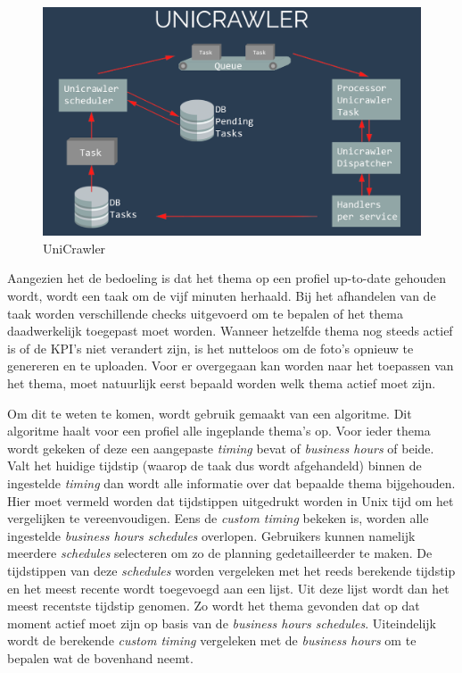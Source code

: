\begin{figure}[H]
	\centering
	\includegraphics[width=1\textwidth]{Figuren/UniCrawler.png}
	\caption{UniCrawler}
	\label{fig:UniCrawler}
\end{figure}

Aangezien het de bedoeling is dat het thema op een profiel up-to-date gehouden wordt, wordt een taak om de vijf minuten herhaald. %
Bij het afhandelen van de taak worden verschillende checks uitgevoerd om te bepalen of het thema daadwerkelijk toegepast moet worden. Wanneer hetzelfde thema nog steeds actief is of de KPI's niet verandert zijn, is het nutteloos om de foto's opnieuw te genereren en te uploaden. Voor er overgegaan kan worden naar het toepassen van het thema, moet natuurlijk eerst bepaald worden welk thema actief moet zijn. 

Om dit te weten te komen, wordt gebruik gemaakt van een algoritme. Dit algoritme haalt voor een profiel alle ingeplande thema's op. Voor ieder thema wordt gekeken of deze een aangepaste \textit{timing} bevat of \textit{business hours} of beide. Valt het huidige tijdstip (waarop de taak dus wordt afgehandeld) binnen de ingestelde \textit{timing} dan wordt alle informatie over dat bepaalde thema bijgehouden. Hier moet vermeld worden dat tijdstippen uitgedrukt worden in Unix tijd om het vergelijken te vereenvoudigen. Eens de \textit{custom timing} bekeken is, worden alle ingestelde \textit{business hours schedules} overlopen. Gebruikers kunnen namelijk meerdere \textit{schedules} selecteren om zo de planning gedetailleerder te maken. De tijdstippen van deze \textit{schedules} worden vergeleken met het reeds berekende tijdstip en het meest recente wordt toegevoegd aan een lijst. Uit deze lijst wordt dan het meest recentste tijdstip genomen. Zo wordt het thema gevonden dat op dat moment actief moet zijn op basis van de \textit{business hours schedules}. Uiteindelijk wordt de berekende \textit{custom timing} vergeleken met de \textit{business hours} om te bepalen wat de bovenhand neemt. 

